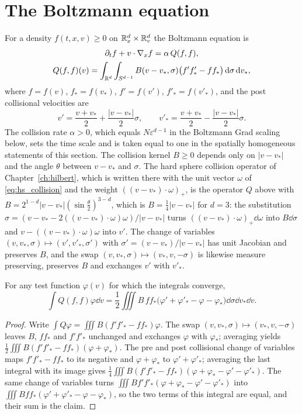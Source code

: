 \section{The Boltzmann equation}

For a density $f(t,x,v)\geq0$ on $\mathbb{R}^d_x\times\mathbb{R}^d_v$ the Boltzmann equation is
\begin{gather*}
\partial_tf+v\cdot\nabla_xf = \alpha\,Q(f,f), \\
Q(f,f)(v) = \int_{\mathbb{R}^d}\int_{S^{d-1}}B(v-v_*,\sigma)\big(f'f'_*-ff_*\big)\,\mathrm{d}\sigma\,\mathrm{d} v_*,
\end{gather*}
where $f = f(v)$, $f_* = f(v_*)$, $f' = f(v')$, $f'_* = f(v'_*)$, and the post collisional velocities are
\[
v' = \frac{v+v_*}{2}+\frac{|v-v_*|}{2}\sigma,\qquad v'_* = \frac{v+v_*}{2}-\frac{|v-v_*|}{2}\sigma.
\]
The collision rate $\alpha>0$, which equals $N\varepsilon^{d-1}$ in the Boltzmann Grad scaling below, sets the time scale and is taken equal to one in the spatially homogeneous statements of this section. The collision kernel $B\geq0$ depends only on $|v-v_*|$ and the angle $\theta$ between $v-v_*$ and $\sigma$. The hard sphere collision operator of Chapter~\ref{ch:hilbert}, which is written there with the unit vector $\omega$ of \eqref{eq:hs_collision} and the weight $((v-v_*)\cdot\omega)_+$, is the operator $Q$ above with $B = 2^{1-d}|v-v_*|(\sin\frac\theta2)^{3-d}$, which is $B = \frac14|v-v_*|$ for $d = 3$: the substitution $\sigma = (v-v_*-2((v-v_*)\cdot\omega)\omega)/|v-v_*|$ turns $((v-v_*)\cdot\omega)_+\dd\omega$ into $B\dd\sigma$ and $v-((v-v_*)\cdot\omega)\omega$ into $v'$. The change of variables $(v,v_*,\sigma)\mapsto(v',v'_*,\sigma')$ with $\sigma' = (v-v_*)/|v-v_*|$ has unit Jacobian and preserves $B$, and the swap $(v,v_*,\sigma)\mapsto(v_*,v,-\sigma)$ is likewise measure preserving, preserves $B$ and exchanges $v'$ with $v'_*$.

\begin{lemma}
\label{lem:weakform}
For any test function $\varphi(v)$ for which the integrals converge,
\[
\int Q(f,f)\varphi\dd v = \frac12\iiint B\,ff_*\big(\varphi'+\varphi'_*-\varphi-\varphi_*\big)\dd\sigma\dd v_*\dd v.
\]
\end{lemma}

\begin{proof}
Write $\int Q\varphi = \iiint B(f'f'_*-ff_*)\varphi$. The swap $(v,v_*,\sigma)\mapsto(v_*,v,-\sigma)$ leaves $B$, $ff_*$ and $f'f'_*$ unchanged and exchanges $\varphi$ with $\varphi_*$; averaging yields $\frac12\iiint B(f'f'_*-ff_*)(\varphi+\varphi_*)$. The pre and post collisional change of variables maps $f'f'_*-ff_*$ to its negative and $\varphi+\varphi_*$ to $\varphi'+\varphi'_*$; averaging the last integral with its image gives $\frac14\iiint B(f'f'_*-ff_*)(\varphi+\varphi_*-\varphi'-\varphi'_*)$. The same change of variables turns $\iiint Bf'f'_*(\varphi+\varphi_*-\varphi'-\varphi'_*)$ into $\iiint Bff_*(\varphi'+\varphi'_*-\varphi-\varphi_*)$, so the two terms of this integral are equal, and their sum is the claim.
\end{proof}

